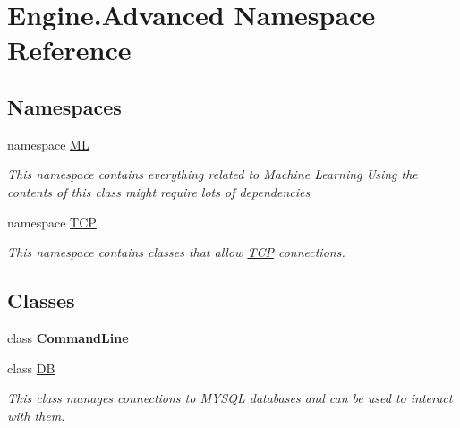 \hypertarget{namespace_engine_1_1_advanced}{}\section{Engine.\+Advanced Namespace Reference}
\label{namespace_engine_1_1_advanced}
\subsection*{Namespaces}
\begin{DoxyCompactItemize}
\item 
namespace \mbox{\hyperlink{namespace_engine_1_1_advanced_1_1_m_l}{ML}}
\begin{DoxyCompactList}\small\item\em This namespace contains everything related to Machine Learning Using the contents of this class might require lots of dependencies \end{DoxyCompactList}\item 
namespace \mbox{\hyperlink{namespace_engine_1_1_advanced_1_1_t_c_p}{T\+CP}}
\begin{DoxyCompactList}\small\item\em This namespace contains classes that allow \mbox{\hyperlink{namespace_engine_1_1_advanced_1_1_t_c_p}{T\+CP}} connections. \end{DoxyCompactList}\end{DoxyCompactItemize}
\subsection*{Classes}
\begin{DoxyCompactItemize}
\item 
class {\bfseries Command\+Line}
\item 
class \mbox{\hyperlink{class_engine_1_1_advanced_1_1_d_b}{DB}}
\begin{DoxyCompactList}\small\item\em This class manages connections to M\+Y\+S\+QL databases and can be used to interact with them. \end{DoxyCompactList}\end{DoxyCompactItemize}
